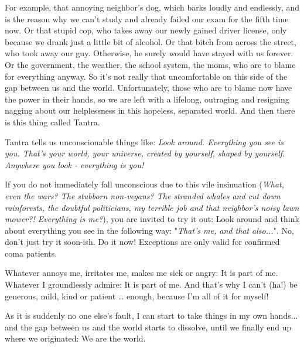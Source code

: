 For example, that annoying neighbor's dog, which barks loudly and endlessly, and is the reason why we can't study and already failed our exam for the fifth time now. Or that stupid cop, who takes away our newly gained driver license, only because we drank just a little bit of alcohol. Or that bitch from across the street, who took away our guy. Otherwise, he surely would have stayed with us forever. Or the government, the weather, the school system, the moms, who are to blame for everything anyway.
So it's not really that uncomfortable on this side of the gap between us and the world. Unfortunately, those who are to blame now have the power in their hands, so we are left with a lifelong, outraging and resigning nagging about our helplessness in this hopeless, separated world. And then there is this thing called Tantra.

Tantra tells us unconscionable things like: \textit{Look around. Everything you see is you. That's your world, your universe, created by yourself, shaped by yourself. Anywhere you look - everything is you!}

If you do not immediately fall unconscious due to this vile insinuation (\textit{What, even the wars? The stubborn non-vegans? The stranded whales and cut down rainforests, the doubtful politicians, my terrible job and that neighbor's noisy lawn mower?! Everything is me?}), you are invited to try it out: Look around and think about everything you see in the following way: "\textit{That's me, and that also...}". No, don't just try it soon-ish. Do it now! Exceptions are only valid for confirmed coma patients.

Whatever annoys me, irritates me, makes me sick or angry: It is part of me. Whatever I groundlessly admire: It is part of me. And that's why I can't (ha!) be generous, mild, kind or patient … enough, because I'm all of it for myself!

As it is suddenly no one else's fault, I can start to take things in my own hands... and the gap between us and the world starts to dissolve, until we finally end up where we originated: We are the world.

